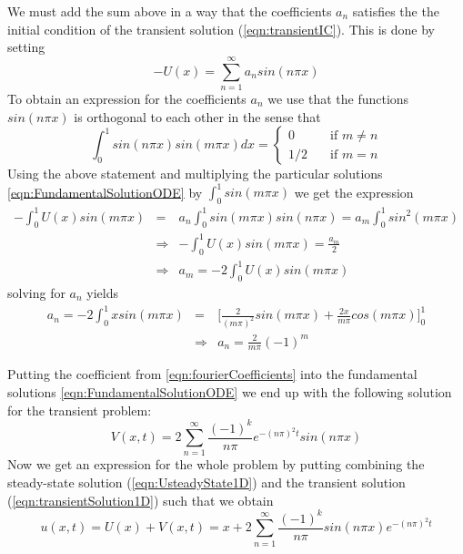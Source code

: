 \documentclass{article}
\begin{document}
We must add the sum above in a way that the coefficients $a_n$ satisfies the the initial condition of the transient solution (\ref{eqn:transientIC}). This is done by setting 
\begin{equation}
-U(x) = \sum_{n=1}^{\infty} a_nsin(n \pi x) 
\end{equation}
To obtain an expression for the coefficients $a_n$ we use that the functions $sin(n\pi x)$ is orthogonal to each other in the sense that 
\begin{equation}
\int_0^1 sin(n\pi x) sin(m\pi x) dx = 
	\begin{cases} 0 & \quad \text{if } m \neq n\\
    1/2 & \quad \text{if } m = n 
    \end{cases}
    \label{eqn:orhogonalSine}
\end{equation}
Using the above statement and multiplying the particular solutions   \ref{eqn:FundamentalSolutionODE} by $\int_0^1sin(m\pi x)$ we get the expression
\begin{eqnarray}
\nonumber
- \int_0^1 U(x)sin(m\pi x) &=& a_n \int_0^1 sin(m\pi x)sin(n\pi x) = a_m\int_0^1 sin^2(m\pi x)\\ \nonumber
&\Rightarrow& - \int_0^1 U(x)sin(m\pi x) =\frac{a_m}{2}\\ 
&\Rightarrow& a_m = - 2\int_0^1 U(x)sin(m\pi x) 
\end{eqnarray}
solving for $a_n$ yields 
\begin{eqnarray}
\nonumber
a_n = -2 \int_0^1 x sin(m\pi x) &=& \Big[\frac{2}{(m\pi)^2} sin(m\pi x) + \frac{2x}{m\pi}cos(m\pi x)\Big]_0^1 \\ 
\label{eqn:fourierCoefficients}
&\Rightarrow & a_n = \frac{2}{m\pi}(-1)^m
\end{eqnarray}
\newline

Putting the coefficient from \ref{eqn:fourierCoefficients} into the fundamental solutions \ref{eqn:FundamentalSolutionODE} we end up with the following solution for the transient problem:
\begin{equation}
V(x,t) = 2\sum_{n=1}^{\infty} \frac{(-1)^k}{n\pi} e^{-(n\pi)^2 t}sin(n\pi x)
\label{eqn:transientSolution1D}
\end{equation}
Now we get an expression for the whole problem by putting combining the steady-state solution (\ref{eqn:UsteadyState1D}) and the transient solution (\ref{eqn:transientSolution1D}) such that we obtain 
\begin{equation}
u(x,t) = U(x) + V(x,t) = x + 2\sum_{n=1}^{\infty} \frac{(-1)^k}{n\pi}
sin(n\pi x)e^{-(n\pi)^2 t}
\label{eqn:solution1D}
\end{equation}
\end{document}
